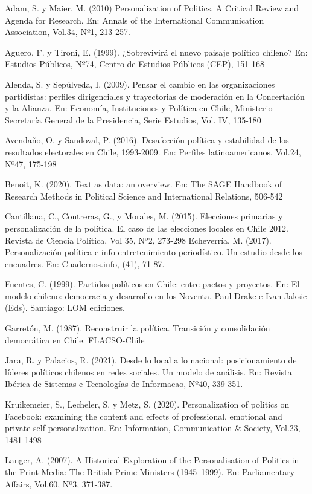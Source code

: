 \documentclass[
  10pt,
  letterpaper,
]{report}
\begin{document}
Adam, S. y Maier, M. (2010) Personalization of Politics. A Critical
Review and Agenda for Research. En: Annals of the International
Communication Association, Vol.34, Nº1, 213-257.

Aguero, F. y Tironi, E. (1999). ¿Sobrevivirá el nuevo paisaje político
chileno? En: Estudios Públicos, Nº74, Centro de Estudios Públicos (CEP),
151-168

Alenda, S. y Sepúlveda, I. (2009). Pensar el cambio en las
organizaciones partidistas: perfiles dirigenciales y trayectorias de
moderación en la Concertación y la Alianza. En: Economía, Instituciones
y Política en Chile, Ministerio Secretaría General de la Presidencia,
Serie Estudios, Vol. IV, 135-180

Avendaño, O. y Sandoval, P. (2016). Desafección política y estabilidad
de los resultados electorales en Chile, 1993-2009. En: Perfiles
latinoamericanos, Vol.24, Nº47, 175-198

Benoit, K. (2020). Text as data: an overview. En: The SAGE Handbook of
Research Methods in Political Science and International Relations,
506-542

Cantillana, C., Contreras, G., y Morales, M. (2015). Elecciones
primarias y personalización de la política. El caso de las elecciones
locales en Chile 2012. Revista de Ciencia Política, Vol 35, Nº2, 273-298
Echeverría, M. (2017). Personalización política e info-entretenimiento
periodístico. Un estudio desde los encuadres. En: Cuadernos.info, (41),
71-87.

Fuentes, C. (1999). Partidos políticos en Chile: entre pactos y
proyectos. En: El modelo chileno: democracia y desarrollo en los
Noventa, Paul Drake e Ivan Jaksic (Eds). Santiago: LOM ediciones.

Garretón, M. (1987). Reconstruir la política. Transición y consolidación
democrática en Chile. FLACSO-Chile

Jara, R. y Palacios, R. (2021). Desde lo local a lo nacional:
posicionamiento de líderes políticos chilenos en redes sociales. Un
modelo de análisis. En: Revista Ibérica de Sistemas e Tecnologías de
Informacao, Nº40, 339-351.

Kruikemeier, S., Lecheler, S. y Metz, S. (2020). Personalization of
politics on Facebook: examining the content and effects of professional,
emotional and private self-personalization. En: Information,
Communication \& Society, Vol.23, 1481-1498

Langer, A. (2007). A Historical Exploration of the Personalisation of
Politics in the Print Media: The British Prime Ministers (1945--1999).
En: Parliamentary Affairs, Vol.60, Nº3, 371-387.
\end{document}
